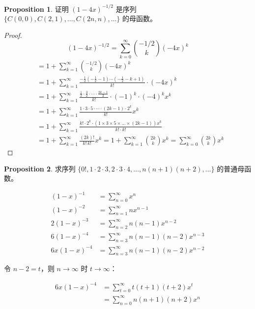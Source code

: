 \documentclass[oneside]{book}
\theoremstyle{definition}
\newtheorem{proposition}{Proposition}[section]
\begin{document}
\begin{proposition}
	证明 \((1 - 4x)^{-1/2}\) 是序列 \(\{C(0,0), C(2,1), \dots, C(2n,n), \dots\}\) 的母函数。
\end{proposition}
	\begin{proof}
		\[
	(1 - 4x)^{-1/2} = \sum_{k=0}^{\infty} \binom{-1/2}{k} (-4x)^k
	\]
	\[
	\begin{aligned}
		&= 1 + \sum_{k=1}^{\infty} \binom{-1/2}{k} (-4x)^k\\
		&	= 1 + \sum_{k=1}^{\infty} \frac{-\frac{1}{2} \left(-\frac{1}{2} - 1\right) \cdots \left(-\frac{1}{2} - k + 1\right)}{k!} \cdot (-4x)^k\\
		&=1 + \sum_{k=1}^{\infty} \frac{\frac{1}{2} \cdot \frac{3}{2} \cdot \cdots \cdot \frac{2k - 1}{2}}{k!} \cdot (-1)^k \cdot (-4)^k x^k\\
		&=1 + \sum_{k=1}^{\infty} \frac{1 \cdot 3 \cdot 5 \cdot \cdots \cdot (2k - 1) \cdot 2^k}{k!} x^k\\
		&= 1 + \sum_{k=1}^{\infty} \frac{k! \cdot 2^k \cdot (1 \times 3 \times 5 \times \dots \times (2k-1)) x^k}{k! \cdot k!}\\
		&= 1 + \sum_{k=1}^{\infty} \frac{(2k)!}{k! \, k!} x^k = 1 + \sum_{k=1}^{\infty} \binom{2k}{k} x^k = \sum_{k=0}^{\infty} \binom{2k}{k} x^k
	\end{aligned}
	\]
	\end{proof}

	\begin{proposition}
		求序列 \(\{0!, 1 \cdot 2 \cdot 3, 2 \cdot 3 \cdot 4, \dots, n(n+1)(n+2), \dots\}\) 的普通母函数。
		
		\[
		\begin{aligned}
			(1 - x)^{-1} &= \sum_{n=0}^{\infty} x^n \\
			(1 - x)^{-2} &= \sum_{n=1}^{\infty} n x^{n-1} \\
			2(1 - x)^{-3} &= \sum_{n=2}^{\infty} n(n-1) x^{n-2} \\
			6(1 - x)^{-4} &= \sum_{n=3}^{\infty} n(n-1)(n-2) x^{n-3} \\
			6x(1 - x)^{-4} &= \sum_{n=3}^{\infty} n(n-1)(n-2) x^{n-2}
		\end{aligned}
		\]
		
		令 \(n - 2 = t\)，则 \(n \to \infty\) 时 \(t \to \infty\)：
		
		\[
		\begin{aligned}
			6x(1 - x)^{-4} &= \sum_{t=0}^{\infty} t(t+1)(t+2) x^t \\
			&= \sum_{n=0}^{\infty} n(n+1)(n+2) x^n
		\end{aligned}
		\]
	\end{proposition}
	
\end{document}
